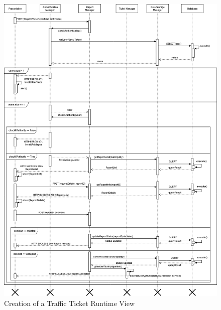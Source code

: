 \begin{figure}[H]
          \includegraphics[scale=0.4]{Images/seq_gen_multa_def_ultimo2.png}
        \caption{Creation of a Traffic Ticket Runtime View}
\end{figure}

